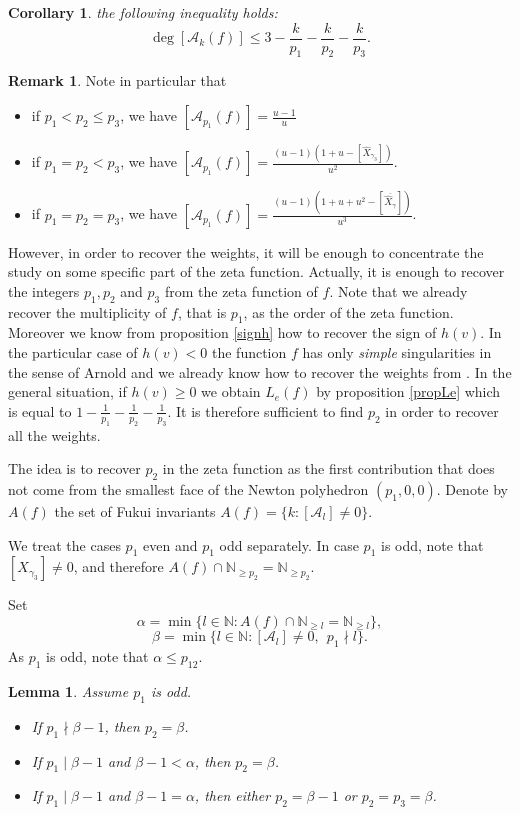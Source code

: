 \documentclass[12pt,a4paper,leqno]{amsart}
\newtheorem{cor}[thm]{Corollary}
\newtheorem{lem}[thm]{Lemma}
\theoremstyle{definition}
\newtheorem{rem}[thm]{Remark}
\begin{document}
\begin{cor}
the following inequality holds:
$$
\deg[\mathcal A_k(f)]\le3-\frac{k}{p_1}-\frac{k}{p_2}-\frac{k}{p_3}.
$$
\end{cor}

\begin{rem} Note in particular that
\begin{itemize}
\item  
if $p_1<p_2\le p_3$, we have $[\mathcal A_{p_1}(f)]=\frac{u-1}{u}$
\item
if $p_1=p_2<p_3$, we have 
$[\mathcal A_{p_1}(f)]=\frac{(u-1)(1+u-[\widehat{X}_{\gamma_3}])}{u^2}$. 
\item 
if $p_1=p_2=p_3$, we have 
$[\mathcal A_{p_1}(f)]
=\frac{(u-1)(1+u+u^2-[\overline{\widehat{X}_{\gamma}}])}{u^3}$. 
\end{itemize}
\end{rem}

However, in order to recover the weights, it will be enough to
concentrate the study on some specific part of the zeta function. Actually, it is enough to recover the integers $p_1,p_2$ and $p_3$ from
the zeta function of $f$. Note that we already recover the
multiplicity of $f$, that is $p_1$, as the order of
the zeta function. Moreover we know from proposition \ref{signh} how
to recover the sign of $h(v)$. In the particular case of $h(v)<0$ the function
$f$ has only \textit{simple} singularities in the sense of Arnold \cite{Arnold}
and we already know how to recover the
weights from \cite{simple}. In the general situation, if $h(v)\geq 0$ we obtain $L_e(f)$ by
proposition \ref{propLe} which is equal to
$1-\frac{1}{p_1}-\frac{1}{p_2}-\frac{1}{p_3}$. It is therefore sufficient
to find $p_2$ in order to recover all the weights.

The idea is to recover $p_2$ in the zeta function as the first
contribution that does not come from the smallest face of the Newton
polyhedron $(p_1,0,0)$. Denote by $A(f)$ the set of Fukui invariants $A(f)=\{k:[\mathcal
A_l]\neq 0 \}$.

We treat the cases $p_1$ even and $p_1$ odd separately.
In case $p_1$ is odd, note that $[X_{\gamma_3}]\neq 0$, and
therefore $A(f)\cap \mathbb N_{\geq p_2}=
\mathbb N_{\geq p_2} $. 

Set 
$$\alpha=\min \{l\in \mathbb N:A(f)\cap \mathbb N_{\geq l}=
\mathbb N_{\geq l}\},$$
$$\beta=\min \{l\in \mathbb N: [\mathcal A_l]
\neq 0,~~p_1 \nmid l\}.$$
As $p_1$ is odd, note that $\alpha \leq p_{12}$.
\begin{lem}
Assume $p_1$ is odd. 
\begin{itemize}
\item If $p_1 \nmid \beta -1$, then $p_2=\beta$.
\item If $p_1 \mid \beta -1$ and $\beta -1< \alpha$, then
  $p_2=\beta$.
\item  If $p_1 \mid \beta -1$ and $\beta -1= \alpha$, then either
$p_2=\beta -1$ or $p_2=p_3=\beta$.
\end{itemize}
\end{lem}
\end{document}
